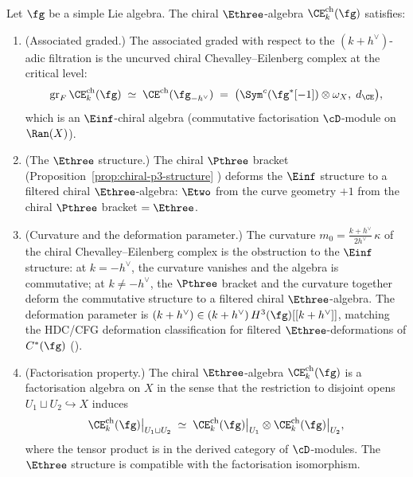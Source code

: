 \begin{theorem}
\label{thm:chiral-e3-structure}
\ClaimStatusProvedHere
Let $\fg$ be a simple Lie algebra.
The chiral $\Ethree$-algebra
$\CE^{\mathrm{ch}}_k(\fg)$ satisfies:
\begin{enumerate}[label=\textup{(\roman*)}]
\item \textup{(Associated graded.)}
 The associated graded with respect to the $(k+h^\vee)$-adic
 filtration is the uncurved chiral Chevalley--Eilenberg
 complex at the critical level:
 \begin{equation}\label{eq:assoc-graded}
 \mathrm{gr}_F\,\CE^{\mathrm{ch}}_k(\fg)
 \;\simeq\;
 \CE^{\mathrm{ch}}(\fg_{-h^\vee})
 \;=\;
 \bigl(\Sym^c(\fg^*[-1]) \otimes \omega_X,\; d_{\CE}\bigr),
 \end{equation}
 which is an $\Einf$-chiral algebra \textup{(}commutative
 factorisation $\cD$-module on $\Ran(X)$\textup{)}.
\item \textup{(The $\Ethree$ structure.)}
 The chiral $\Pthree$ bracket
 \textup{(}Proposition~\textup{\ref{prop:chiral-p3-structure}}%
 \textup{)} deforms the $\Einf$ structure to
 a filtered chiral $\Ethree$-algebra:
 $\Etwo$ from the curve geometry
 $+ 1$ from the chiral $\Pthree$ bracket
 $= \Ethree$.
\item \textup{(Curvature and the deformation parameter.)}
 The curvature
 $m_0 = \tfrac{k + h^\vee}{2h^\vee}\,\kappa$ of the chiral
 Chevalley--Eilenberg complex is the obstruction to the
 $\Einf$ structure: at $k = -h^\vee$, the curvature vanishes
 and the algebra is commutative; at $k \neq -h^\vee$, the
 $\Pthree$ bracket and the curvature together deform the
 commutative structure to a filtered chiral $\Ethree$-algebra.
 The deformation parameter is $(k+h^\vee) \in
 (k+h^\vee)\,H^3(\fg)[[k+h^\vee]]$,
 matching the HDC/CFG deformation classification for filtered
 $\Ethree$-deformations of $C^*(\fg)$
 \textup{(}\cite{HA,Francis2013,CFG25}\textup{)}.
\item \textup{(Factorisation property.)}
 The chiral $\Ethree$-algebra
 $\CE^{\mathrm{ch}}_k(\fg)$ is a factorisation algebra on
 $X$ in the sense that the restriction to disjoint
 opens $U_1 \sqcup U_2 \hookrightarrow X$ induces
 \begin{equation}\label{eq:factorisation}
 \CE^{\mathrm{ch}}_k(\fg)\big|_{U_1 \sqcup U_2}
 \;\simeq\;
 \CE^{\mathrm{ch}}_k(\fg)\big|_{U_1}
 \otimes
 \CE^{\mathrm{ch}}_k(\fg)\big|_{U_2},
 \end{equation}
 where the tensor product is in the derived category of
 $\cD$-modules. The $\Ethree$ structure is compatible with
 the factorisation isomorphism.
\end{enumerate}
\end{theorem}

